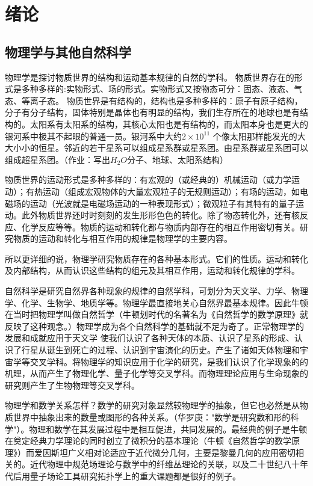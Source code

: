 \chapter{绪论}
\section{物理学与其他自然科学}

   物理学是探讨物质世界的结构和运动基本规律的自然的学科。 
   物质世界存在的形式是多种多样的:实物形式、场的形式。实物形式又按物态可分：固态、液态、气态、等离子态。 
   物质世界是有结构的，结构也是多种多样的：原子有原子结构，分子有分子结构，固体特别是晶体也有明显的结构，我们生存所在的地球也是有结构的。太阳系有太阳系的结构，其核心太阳也是有结构的，而太阳本身也是更大的银河系中极其不起眼的普通一员。银河系中大约$2\times10^{11}$ 个像太阳那样能发光的大大小小的恒星。邻近的若干星系可以组成星系群或星系团。由星系群或星系团可以组成超星系团。（作业：写出$H_2O $分子、地球、太阳系结构）
   
   
   物质世界的运动形式是多种多样的：有宏观的（或经典的）机械运动（或力学运动）；有热运动（组成宏观物体的大量宏观粒子的无规则运动）；有场的运动，如电磁场的运动（光波就是电磁场运动的一种表现形式）；微观粒子有其特有的量子运动。此外物质世界还时时刻刻的发生形形色色的转化。除了物态转化外，还有核反应、化学反应等等。物质的运动和转化都与物质内部存在的相互作用密切有关。研究物质的运动和转化与相互作用的规律是物理学的主要内容。
   
    所以更详细的说，物理学研究物质存在的各种基本形式。它们的性质。运动和转化及内部结构，从而认识这些结构的组元及其相互作用，运动和转化规律的学科。
    
    自然科学是研究自然界各种现象的规律的自然学科，可划分为天文学、力学、物理学、化学、生物学、地质学等。物理学最直接地关心自然界最基本规律。因此牛顿在当时把物理学叫做自然哲学（牛顿划时代的名著名为《自然哲学的数学原理》就反映了这种观念。）物理学成为各个自然科学的基础就不足为奇了。正常物理学的发展和成就应用于天文学 使我们认识了各种天体的本质、认识了星系的形成、认识了行星从诞生到死亡的过程、认识到宇宙演化的历史。产生了诸如天体物理和宇宙学等交叉学科。将物理学的知识应用于化学的研究，是我们认识了化学现象的的机理，从而产生了物理化学、量子化学等交叉学科。而物理理论应用与生命现象的研究则产生了生物物理等交叉学科。
    
    物理学和数学关系怎样？数学的研究对象显然较物理学的抽象，但它也必然是从物质世界中抽象出来的数量或图形的各种关系。（华罗庚："数学是研究数和形的科学"）。物理和数学在其发展过程中是相互促进，共同发展的。最经典的例子是牛顿在奠定经典力学理论的同时创立了微积分的基本理论（牛顿《自然哲学的数学原理》）而爱因斯坦广义相对论适应于近代微分几何，主要是黎曼几何的应用密切相关的。近代物理中规范场理论与数学中的纤维丛理论的关联，以及二十世纪八十年代后用量子场论工具研究拓扑学上的重大课题都是很好的例子。
    
